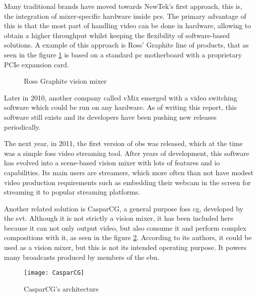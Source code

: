 \documentclass[../main.tex]{subfiles}
\begin{document}
Many traditional brands have moved towards NewTek's first approach, this is, the integration of mixer-specific hardware inside \glspl{pc}. The primary advantage of this is that the most part of handling video can be done in hardware, allowing to obtain a higher throughput whilst keeping the flexibility of software-based solutions. A example of this approach is Ross' Graphite line of products, that as seen in the figure \ref{fig:ross_graphite} is based on a standard \gls{pc} motherboard with a proprietary PCIe expansion card\cite{graphiteManual}.\newline

\begin{figure}[htbp]
    \centering

    \caption{Ross Graphite vision mixer}
    \label{fig:ross_graphite}
\end{figure}

Later in 2010, another company called vMix emerged with a video switching software which could be run on any hardware. As of writing this report, this software still exists and its developers have been pushing new releases periodically.\newline

The next year, in 2011, the first version of \gls{obs} was released, which at the time was a simple \gls{foss} video streaming tool. After years of development, this software has evolved into a scene-based vision mixer with lots of features and \gls{io} capabilities\cite{obsWiki}. Its main users are streamers, which more often than not have modest video production requirements such as embedding their webcam in the screen for streaming it to popular streaming platforms.\newline

Another related solution is CasparCG, a general purpose \gls{foss} \gls{cg}, developed by the \gls{svt}. Although it is not strictly a vision mixer, it has been included here because it can not only output video, but also consume it and perform complex compositions with it, as seen in the figure \ref{fig:casparcg}. According to its authors, it could be used as a vision mixer, but this is not its intended operating purpose. It powers many broadcasts produced by members of the \gls{ebu}\cite{casparcgWiki}.\newline

\begin{figure}[htbp]
    \centering
    \texttt{[image: CasparCG]}
    \caption{CasparCG's architecture}
    \label{fig:casparcg}
\end{figure}
\end{document}
